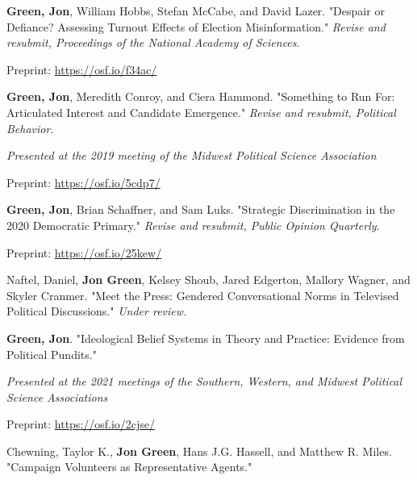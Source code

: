 \documentclass[letterpaper]{article}
\renewenvironment{itemize}{
  \begin{list}{}{
    \setlength{\leftmargin}{1.5em}
  }
}{
  \end{list}
}
\begin{document}
\begin{itemize}

\item  \textbf{Green, Jon}, William Hobbs, Stefan McCabe, and David Lazer. "Despair or Defiance? Assessing Turnout Effects of Election Misinformation."  \textit{Revise and resubmit, Proceedings of the National Academy of Sciences}.
\begin{itemize}
\item Preprint: \url{https://osf.io/f34ac/}
\end{itemize}

\item \textbf{Green, Jon}, Meredith Conroy, and Ciera Hammond. "Something to Run For: Articulated Interest and Candidate Emergence."   \textit{Revise and resubmit, Political Behavior}.
\begin{itemize}
\item \textit{Presented at the 2019 meeting of the Midwest Political Science Association}
\item Preprint: \url{https://osf.io/5cdp7/}
\end{itemize}

\item \textbf{Green, Jon}, Brian Schaffner, and Sam Luks. "Strategic Discrimination in the 2020 Democratic Primary."  \textit{Revise and resubmit, Public Opinion Quarterly}.
\begin{itemize}
\item Preprint: \url{https://osf.io/25kew/}
\end{itemize}

\item Naftel, Daniel, \textbf{Jon Green}, Kelsey Shoub, Jared Edgerton, Mallory Wagner, and Skyler Cranmer. "Meet the Press: Gendered Conversational Norms in Televised Political Discussions." \textit{Under review.}

\item \textbf{Green, Jon}. "Ideological Belief Systems in Theory and Practice: Evidence from Political Pundits." 
\begin{itemize}
\item \textit{Presented at the 2021 meetings of the Southern, Western, and Midwest Political Science Associations}
\item Preprint: \url{https://osf.io/2cjse/}
\end{itemize}

\item Chewning, Taylor K., \textbf{Jon Green}, Hans J.G. Hassell, and Matthew R. Miles. "Campaign Volunteers as Representative Agents."


\end{itemize}
\end{document}
